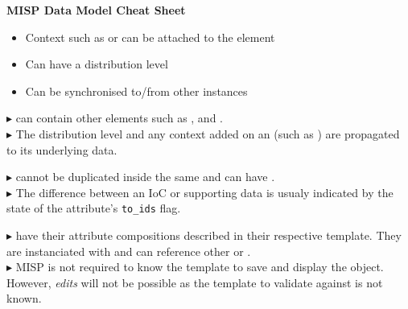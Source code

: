 \begin{center}{
    \huge{\textbf{MISP Data Model Cheat Sheet}}}\\
\end{center}

\begin{multicols*}{3}
    \begin{minipage}{0.3\textwidth}
        \begin{itemize}[noitemsep,topsep=2pt,parsep=0pt,partopsep=0pt]
            \item[\taggable] Context such as \taxonomies or \clusters can be attached to the element
            \item[\distributable] Can have a distribution level 
            \item[\synchronisable] Can be synchronised to/from other instances
        \end{itemize}
    \end{minipage}
    \vspace*{0.5em}

        {
            $\blacktriangleright$ \events can contain other elements such as \attributes, \objects and \eventreports.\\
            $\blacktriangleright$ The distribution level and any context added on an \event (such as \taxonomies) are propagated to its underlying data.
        }

        {
            $\blacktriangleright$ \attributes cannot be duplicated inside the same \event and can have \sightings.\\
            $\blacktriangleright$ The difference between an IoC or supporting data is usualy indicated by the state of the attribute's \texttt{to\_ids} flag.
        }

        {
            $\blacktriangleright$ \objects have their attribute compositions described in their respective template. They are instanciated with \attributes and can reference  other \attributes or \objects.\\
            $\blacktriangleright$ MISP is not required to know the template to save and display the object. However, \textit{edits} will not be possible as the template to validate against is not known.
        }
    \columnbreak


\end{multicols*}
